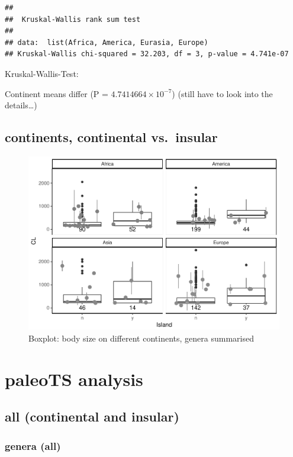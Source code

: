 \documentclass[]{article}
\begin{document}
\begin{verbatim}
## 
##  Kruskal-Wallis rank sum test
## 
## data:  list(Africa, America, Eurasia, Europe)
## Kruskal-Wallis chi-squared = 32.203, df = 3, p-value = 4.741e-07
\end{verbatim}

Kruskal-Wallis-Test:

Continent means differ (P = \(4.7414664\times 10^{-7}\)) (still have to
look into the details\ldots{})

\newpage

\subsection{continents, continental
vs.~insular}\label{continents-continental-vs.insular}

\begin{figure}[htbp]
\centering
\includegraphics{MA_JJ_files/figure-latex/BPConCI-1.pdf}
\caption{Boxplot: body size on different continents, genera summarised}
\end{figure}

\newpage

\section{paleoTS analysis}\label{paleots-analysis}

\subsection{all (continental and
insular)}\label{all-continental-and-insular}

\subsubsection{genera (all)}\label{genera-all}
\end{document}
